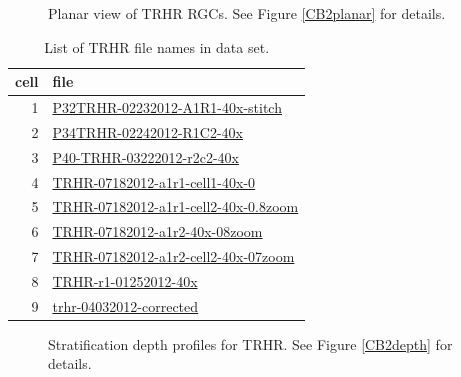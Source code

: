 \documentclass{article}
\begin{document}
\clearpage

\begin{figure}
  \centering
  \caption{Planar view of TRHR RGCs. See Figure \ref{CB2planar} for details.}
\end{figure}

\begin{table}
  \centering
  \begin{tabular}{rl}
    \toprule
    cell & file \\
    \midrule
1& \url{P32TRHR-02232012-A1R1-40x-stitch} \\
2& \url{P34TRHR-02242012-R1C2-40x} \\
3& \url{P40-TRHR-03222012-r2c2-40x} \\
4& \url{TRHR-07182012-a1r1-cell1-40x-0} \\
5& \url{TRHR-07182012-a1r1-cell2-40x-0.8zoom} \\
6& \url{TRHR-07182012-a1r2-40x-08zoom} \\
7& \url{TRHR-07182012-a1r2-cell2-40x-07zoom} \\
8& \url{TRHR-r1-01252012-40x} \\
9& \url{trhr-04032012-corrected} \\
\bottomrule
  \end{tabular}
  \caption{List of TRHR file names in data set.}

\end{table}


\clearpage

\begin{figure}
  \centering
  \caption{Stratification depth profiles for TRHR. See Figure
    \ref{CB2depth} for details.}
\end{figure}
\end{document}
